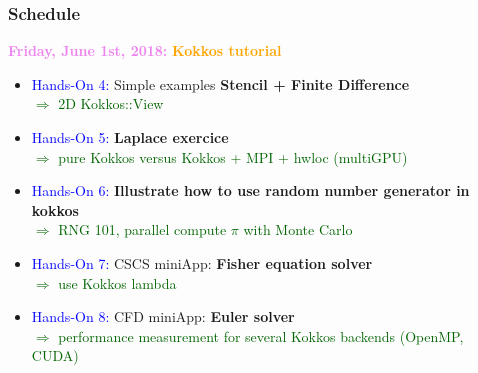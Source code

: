 \begin{frame}
  \frametitle{Schedule}

  {\bf \large \textcolor{violet}{Friday, June 1st, 2018:}} \textcolor{orange}{\bf Kokkos tutorial}
  \begin{itemize}
  \item \textcolor{blue}{Hands-On 4:} Simple examples \textbf{Stencil + Finite Difference}\\
    \textcolor{darkgreen}{$\Rightarrow$ 2D Kokkos::View}
  \item \textcolor{blue}{Hands-On 5:} \textbf{Laplace exercice}\\
    \textcolor{darkgreen}{$\Rightarrow$ pure Kokkos versus Kokkos + MPI + hwloc (multiGPU)}
  \item \textcolor{blue}{Hands-On 6:} \textbf{Illustrate how to use random number generator in kokkos}\\
    \textcolor{darkgreen}{$\Rightarrow$ RNG 101, parallel compute $\pi$ with Monte Carlo}
  \item \textcolor{blue}{Hands-On 7:} CSCS miniApp: \textbf{Fisher equation solver}\\
    \textcolor{darkgreen}{$\Rightarrow$ use Kokkos lambda}
  \item \textcolor{blue}{Hands-On 8:} CFD miniApp: \textbf{Euler solver}\\
    \textcolor{darkgreen}{$\Rightarrow$ performance measurement for several Kokkos backends (OpenMP, CUDA)}
  \end{itemize}
\end{frame}
